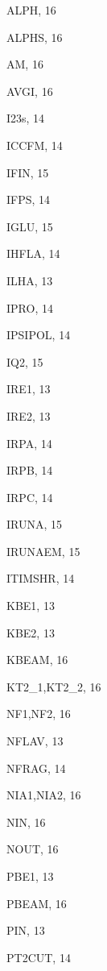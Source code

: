 \documentclass[11pt]{article} \usepackage{mystyle-new}
\begin{document}
\begin{theindex}

  \item ALPH, 16
  \item ALPHS, 16
  \item AM, 16
  \item AVGI, 16

  \indexspace

  \item I23s, 14
  \item ICCFM, 14
  \item IFIN, 15
  \item IFPS, 14
  \item IGLU, 15
  \item IHFLA, 14
  \item ILHA, 13
  \item IPRO, 14
  \item IPSIPOL, 14
  \item IQ2, 15
  \item IRE1, 13
  \item IRE2, 13
  \item IRPA, 14
  \item IRPB, 14
  \item IRPC, 14
  \item IRUNA, 15
  \item IRUNAEM, 15
  \item ITIMSHR, 14

  \indexspace

  \item KBE1, 13
  \item KBE2, 13
  \item KBEAM, 16
  \item KT2\_1,KT2\_2, 16

  \indexspace

  \item NF1,NF2, 16
  \item NFLAV, 13
  \item NFRAG, 14
  \item NIA1,NIA2, 16
  \item NIN, 16
  \item NOUT, 16

  \indexspace

  \item PBE1, 13
  \item PBEAM, 16
  \item PIN, 13
  \item PT2CUT, 14


\end{theindex}
\end{document}
